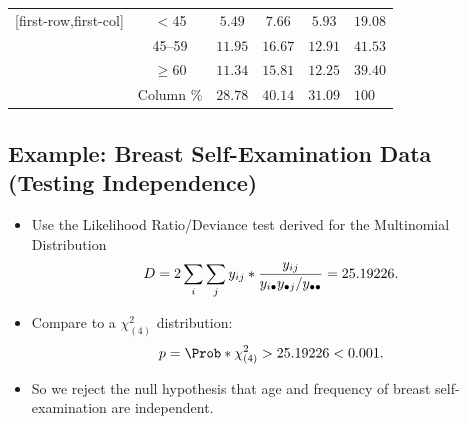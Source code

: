 \documentclass{article}\usepackage[]{graphicx}\usepackage[svgnames]{xcolor}
\let\log\relax%
\begin{document}
\begin{itemize}
\begin{table}[H]
\begin{NiceTabular}{c|ccc|c}[first-row,first-col]
                        \midrule
                         & $<$45     & $ 5.49 $                         & $ 7.66 $    & $ 5.93 $  & $ 19.08 $  \\
                        & 45--59                     & $ 11.95 $                       & $ 16.67 $   & $ 12.91 $ & $ 41.53 $  \\
                        & $ \ge $60                  & $ 11.34 $                       & $ 15.81 $   & $ 12.25 $ & $ 39.40 $  \\
                        \midrule
                        & Column \%                       & $ 28.78 $                         & $ 40.14  $      & $ 31.09 $    & $ 100 $
                  \end{NiceTabular}
            \end{table}
\end{itemize}
\subsection*{Example: Breast Self-Examination Data (Testing Independence)}
\begin{itemize}
      \item Use the Likelihood Ratio/Deviance test derived for the Multinomial Distribution
            \[ D=2\sum_i\sum_j y_{ij}\log*{\frac{y_{ij}}{y_{i\bullet}y_{\bullet j}/y_{\bullet\bullet}}}=25.19226. \]
      \item Compare to a $ \chi^2_{(4)} $ distribution:
            \[ p=\Prob*{\chi^2_{(4)}>25.19226}<0.001. \]
      \item So we reject the null hypothesis that age and frequency of breast self-examination
            are independent.
\end{itemize}
\end{document}
